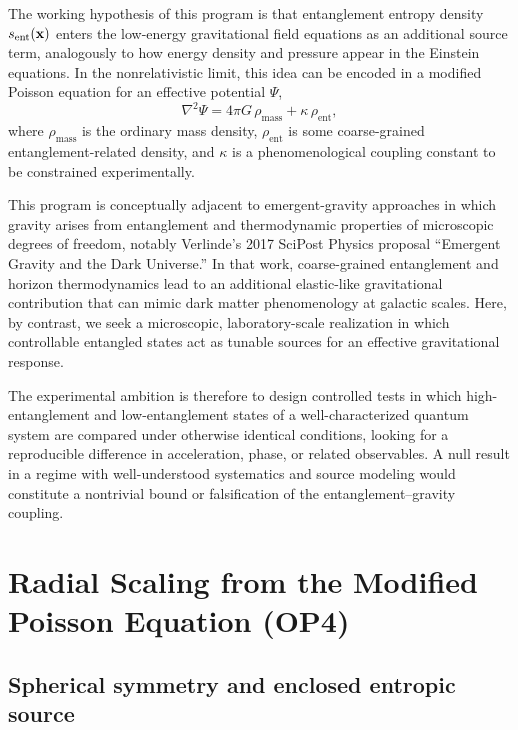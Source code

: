 \documentclass[11pt]{article}
\begin{document}
The working hypothesis of this program is that entanglement entropy density $s_{\text{ent}}(\vb{x})$ enters the low-energy gravitational field equations as an additional source term, analogously to how energy density and pressure appear in the Einstein equations. In the nonrelativistic limit, this idea can be encoded in a modified Poisson equation for an effective potential $\Psi$,
\begin{equation}
 \nabla^2 \Psi = 4\pi G\,\rho_{\text{mass}} + \kappa\,\rho_{\text{ent}},
 \label{eq:poisson-modified}
\end{equation}
where $\rho_{\text{mass}}$ is the ordinary mass density, $\rho_{\text{ent}}$ is some coarse-grained entanglement-related density, and $\kappa$ is a phenomenological coupling constant to be constrained experimentally.

This program is conceptually adjacent to emergent-gravity approaches in which gravity arises from entanglement and thermodynamic properties of microscopic degrees of freedom, notably Verlinde's 2017 SciPost Physics proposal ``Emergent Gravity and the Dark Universe.'' In that work, coarse-grained entanglement and horizon thermodynamics lead to an additional elastic-like gravitational contribution that can mimic dark matter phenomenology at galactic scales. Here, by contrast, we seek a microscopic, laboratory-scale realization in which controllable entangled states act as tunable sources for an effective gravitational response.

The experimental ambition is therefore to design controlled tests in which high-entanglement and low-entanglement states of a well-characterized quantum system are compared under otherwise identical conditions, looking for a reproducible difference in acceleration, phase, or related observables. A null result in a regime with well-understood systematics and source modeling would constitute a nontrivial bound or falsification of the entanglement--gravity coupling.

\section{Radial Scaling from the Modified Poisson Equation (OP4)}

\subsection{Spherical symmetry and enclosed entropic source}
\end{document}
